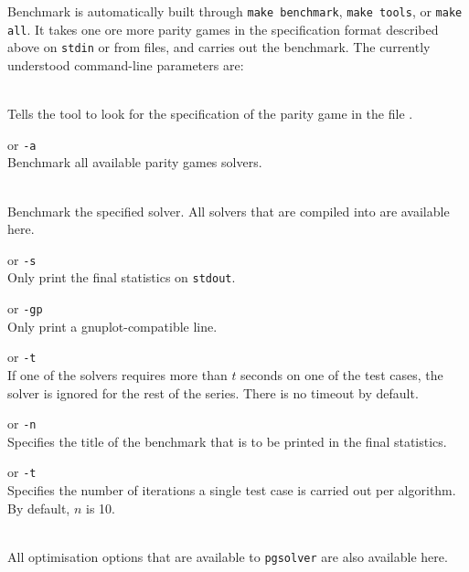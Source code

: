 Benchmark is automatically built through \verb#make benchmark#, \verb#make tools#, or \verb#make all#.
It takes one ore more parity games in the specification format described above on \texttt{stdin} or
from files, and carries out the benchmark. The currently understood command-line parameters are:

\begin{description}
\itemsep3mm
\item[\nonterminal{filename}] \ \\
   Tells the tool to look for the specification of the parity game in the file
   .

\item[{\tt --all}] \enspace or {\tt -a} \\
   Benchmark all available parity games solvers.

\item[{\tt --\nonterminal{solver}}] \ \\
   Benchmark the specified solver. All solvers that are compiled into \pgsolver are available here.

\item[{\tt --silent}] \enspace or {\tt -s} \\
   Only print the final statistics on \texttt{stdout}.

\item[{\tt --gnuplotformat}] \enspace or {\tt -gp} \\
   Only print a gnuplot-compatible line.

 \item[{\tt --timeout \nonterminal{timeout}}] \enspace or {\tt -t } \\
   If one of the solvers requires more than $t$ seconds on one of the test cases, the solver is ignored
   for the rest of the series. There is no timeout by default.

\item[{\tt --name \nonterminal{title}}] \enspace or {\tt -n } \\
   Specifies the title of the benchmark that is to be printed in the final statistics.

 \item[{\tt --times \nonterminal{n}}] \enspace or {\tt -t } \\
   Specifies the number of iterations a single test case is carried out per algorithm. By default, $n$
   is 10.

\item[{\tt --\nonterminal{optimisation-option}}] \ \\
   All optimisation options that are available to \texttt{pgsolver} are also available here.
\end{description}



